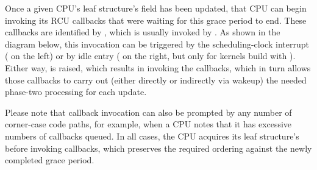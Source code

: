 Once a given CPU's leaf  structure's  field has
been updated, that CPU can begin invoking its RCU callbacks that were
waiting for this grace period to end.
These callbacks are identified by
, which is usually invoked by
.
As shown in the diagram below, this invocation
can be triggered by the scheduling-clock interrupt
( on the left) or by idle entry
( on the right, but only for kernels build
with ).
Either way,  is
raised, which results in  invoking the callbacks,
which in turn allows those callbacks to carry out (either directly or
indirectly via wakeup) the needed phase-two processing for each update.

\begin{center}
\end{center}

Please note that callback invocation can also be prompted by any number
of corner-case code paths, for example, when a CPU notes that it has
excessive numbers of callbacks queued.
In all cases, the CPU acquires
its leaf  structure's  before invoking callbacks,
which preserves the required ordering against the newly completed grace
period.


